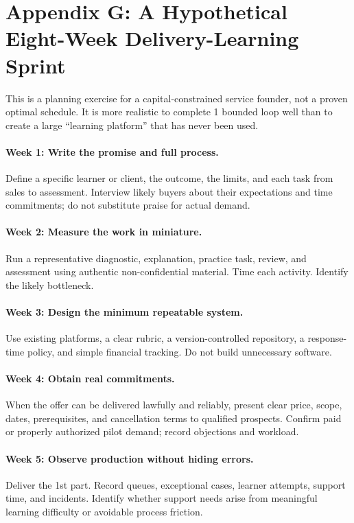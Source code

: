 \section*{Appendix G: A Hypothetical Eight-Week Delivery-Learning Sprint}

This is a planning exercise for a capital-constrained service founder, not a proven optimal schedule. It is more realistic to complete 1 bounded loop well than to create a large ``learning platform'' that has never been used.

\paragraph*{Week 1: Write the promise and full process.} Define a specific learner or client, the outcome, the limits, and each task from sales to assessment. Interview likely buyers about their expectations and time commitments; do not substitute praise for actual demand.

\paragraph*{Week 2: Measure the work in miniature.} Run a representative diagnostic, explanation, practice task, review, and assessment using authentic non-confidential material. Time each activity. Identify the likely bottleneck.

\paragraph*{Week 3: Design the minimum repeatable system.} Use existing platforms, a clear rubric, a version-controlled repository, a response-time policy, and simple financial tracking. Do not build unnecessary software.

\paragraph*{Week 4: Obtain real commitments.} When the offer can be delivered lawfully and reliably, present clear price, scope, dates, prerequisites, and cancellation terms to qualified prospects. Confirm paid or properly authorized pilot demand; record objections and workload.

\paragraph*{Week 5: Observe production without hiding errors.} Deliver the 1st part. Record queues, exceptional cases, learner attempts, support time, and incidents. Identify whether support needs arise from meaningful learning difficulty or avoidable process friction.

